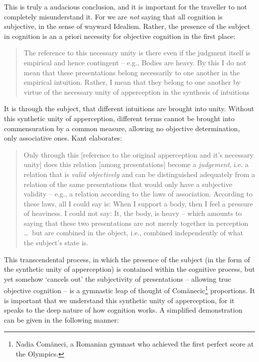 This is truly a audacious conclusion, and it is important for the traveller to not completely misunderstand it. For we are \emph{not} saying that all cognition is subjective, in the sense of wayward Idealism. Rather, the presence of the subject in cognition is an a priori necessity for objective cognition in the first place:

\begin{quote}
  The reference to this necessary unity is there even if the judgment itself is empirical and hence contingent -- e.g., Bodies are heavy. By this I do not mean that these presentations belong necessarily to one another in the empirical intuition. Rather, I mean that they belong to one another by virtue of the necessary unity of apperception in the synthesis of intuitions

  \autocite[B142]{hackett}
\end{quote}

\noindent
It is through the subject, that different intuitions are brought into unity. Without this synthetic unity of apperception, different terms cannot be brought into commensuration by a common measure, allowing no objective determination, only associative ones. Kant elaborates:

\begin{quote}
  Only through this [reference to the original apperception and it's necessary unity] does this relation [among presentations] become a \emph{judgement}, i.e. a relation that is \emph{valid objectively} and can be distinguished adequately from a relation of the same presentations that would only have a subjective validity -- e.g., a relation according to the laws of association. According to these laws, all I could say is: When I support a body, then I feel a pressure of heaviness. I could not say: It, the body, is heavy -- which amounts to saying that these two presentations are not merely together in perception \ldots\ but are combined in the object, i.e., combined independently of what the subject's state is.

  \autocite[B143]{hackett}
\end{quote}

This transcendental process, in which the presence of the subject (in the form of the synthetic unity of apperception) is contained within the cognitive process, but yet somehow `cancels out' the subjectivity of presentations -- allowing true objective cognition -- is a gymnastic leap of thought of Comănecic\footnote{Nadia Comăneci, a Romanian gymnast who achieved the first perfect score at the Olympics.} proportions. It is important that we understand this synthetic unity of apperception, for it speaks to the deep nature of how cognition works. A simplified demonstration can be given in the following manner:

